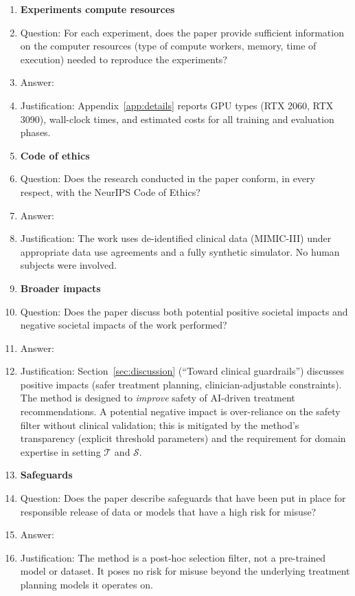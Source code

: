 \documentclass{article}
\newcommand{\cT}{\mathcal{T}}
\newcommand{\cS}{\mathcal{S}}
\begin{document}
\begin{enumerate}
\item {\bf Experiments compute resources}
    \item[] Question: For each experiment, does the paper provide sufficient information on the computer resources (type of compute workers, memory, time of execution) needed to reproduce the experiments?
    \item[] Answer: \answerYes{}
    \item[] Justification: Appendix~\ref{app:details} reports GPU types (RTX 2060, RTX 3090), wall-clock times, and estimated costs for all training and evaluation phases.

\item {\bf Code of ethics}
    \item[] Question: Does the research conducted in the paper conform, in every respect, with the NeurIPS Code of Ethics?
    \item[] Answer: \answerYes{}
    \item[] Justification: The work uses de-identified clinical data (MIMIC-III) under appropriate data use agreements and a fully synthetic simulator. No human subjects were involved.

\item {\bf Broader impacts}
    \item[] Question: Does the paper discuss both potential positive societal impacts and negative societal impacts of the work performed?
    \item[] Answer: \answerYes{}
    \item[] Justification: Section~\ref{sec:discussion} (``Toward clinical guardrails'') discusses positive impacts (safer treatment planning, clinician-adjustable constraints). The method is designed to \emph{improve} safety of AI-driven treatment recommendations. A potential negative impact is over-reliance on the safety filter without clinical validation; this is mitigated by the method's transparency (explicit threshold parameters) and the requirement for domain expertise in setting $\cT$ and $\cS$.

\item {\bf Safeguards}
    \item[] Question: Does the paper describe safeguards that have been put in place for responsible release of data or models that have a high risk for misuse?
    \item[] Answer: \answerNA{}
    \item[] Justification: The method is a post-hoc selection filter, not a pre-trained model or dataset. It poses no risk for misuse beyond the underlying treatment planning models it operates on.


\end{enumerate}
\end{document}

